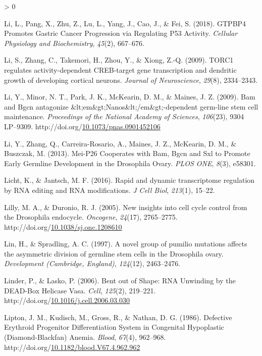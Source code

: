 \documentclass[12pt,oneside]{reedthesis}
\newlength{\cslhangindent}
\newenvironment{CSLReferences}[2] %
 {%
  \setlength{\parindent}{0pt}
  \ifodd #1 \everypar{\setlength{\hangindent}{\cslhangindent}}\ignorespaces\fi
  \ifnum #2 > 0
  \setlength{\parskip}{#2\baselineskip}
  \fi
 }%
 {}
\begin{document}
\begin{CSLReferences}{1}{0}
\leavevmode\hypertarget{ref-Li2018a}{}%
Li, L., Pang, X., Zhu, Z., Lu, L., Yang, J., Cao, J., \& Fei, S. (2018). {GTPBP4 Promotes Gastric Cancer Progression} via {Regulating P53 Activity}. \emph{Cellular Physiology and Biochemistry}, \emph{45}(2), 667--676.

\leavevmode\hypertarget{ref-Li2009n}{}%
Li, S., Zhang, C., Takemori, H., Zhou, Y., \& Xiong, Z.-Q. (2009). {TORC1} regulates activity-dependent {CREB}-target gene transcription and dendritic growth of developing cortical neurons. \emph{Journal of Neuroscience}, \emph{29}(8), 2334--2343.

\leavevmode\hypertarget{ref-Li2009h}{}%
Li, Y., Minor, N. T., Park, J. K., McKearin, D. M., \& Maines, J. Z. (2009). Bam and {Bgcn} antagonize \&lt;em\&gt;{Nanos}\&lt;/em\&gt;-dependent germ-line stem cell maintenance. \emph{Proceedings of the National Academy of Sciences}, \emph{106}(23), 9304 LP--9309. http://doi.org/\href{https://doi.org/10.1073/pnas.0901452106}{10.1073/pnas.0901452106}

\leavevmode\hypertarget{ref-Li2013h}{}%
Li, Y., Zhang, Q., Carreira-Rosario, A., Maines, J. Z., McKearin, D. M., \& Buszczak, M. (2013). Mei-{P26 Cooperates} with {Bam}, {Bgcn} and {Sxl} to {Promote Early Germline Development} in the {Drosophila Ovary}. \emph{PLOS ONE}, \emph{8}(3), e58301.

\leavevmode\hypertarget{ref-Licht2016}{}%
Licht, K., \& Jantsch, M. F. (2016). Rapid and dynamic transcriptome regulation by {RNA} editing and {RNA} modifications. \emph{J Cell Biol}, \emph{213}(1), 15--22.

\leavevmode\hypertarget{ref-Lilly2005d}{}%
Lilly, M. A., \& Duronio, R. J. (2005). New insights into cell cycle control from the {Drosophila} endocycle. \emph{Oncogene}, \emph{24}(17), 2765--2775. http://doi.org/\href{https://doi.org/10.1038/sj.onc.1208610}{10.1038/sj.onc.1208610}

\leavevmode\hypertarget{ref-Lin1997b}{}%
Lin, H., \& Spradling, A. C. (1997). A novel group of pumilio mutations affects the asymmetric division of germline stem cells in the {Drosophila} ovary. \emph{Development (Cambridge, England)}, \emph{124}(12), 2463--2476.

\leavevmode\hypertarget{ref-Linder2006}{}%
Linder, P., \& Lasko, P. (2006). Bent out of {Shape}: {RNA Unwinding} by the {DEAD}-{Box Helicase Vasa}. \emph{Cell}, \emph{125}(2), 219--221. http://doi.org/\href{https://doi.org/10.1016/j.cell.2006.03.030}{10.1016/j.cell.2006.03.030}

\leavevmode\hypertarget{ref-liptonDefectiveErythroidProgenitor1986}{}%
Lipton, J. M., Kudisch, M., Gross, R., \& Nathan, D. G. (1986). Defective {Erythroid Progenitor Differentiation System} in {Congenital Hypoplastic} ({Diamond}-{Blackfan}) {Anemia}. \emph{Blood}, \emph{67}(4), 962--968. http://doi.org/\href{https://doi.org/10.1182/blood.V67.4.962.962}{10.1182/blood.V67.4.962.962}


\end{CSLReferences}
\end{document}
